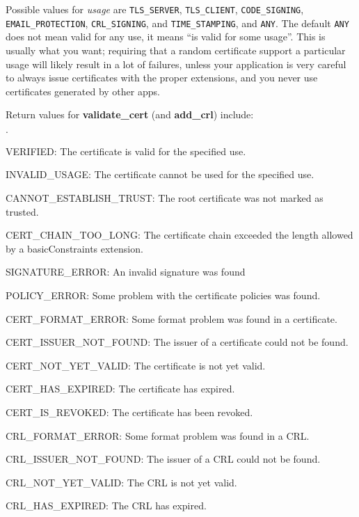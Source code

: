 \documentclass{article}
\newcommand{\function}[1]{\textbf{#1}}
\newcommand{\type}[1]{\texttt{#1}}
\renewcommand{\arg}[1]{\textsl{#1}}
\begin{document}
Possible values for \arg{usage} are \type{TLS\_SERVER},
\type{TLS\_CLIENT}, \type{CODE\_SIGNING}, \type{EMAIL\_PROTECTION},
\type{CRL\_SIGNING}, and \type{TIME\_STAMPING}, and \type{ANY}. The
default \type{ANY} does not mean valid for any use, it means ``is
valid for some usage''. This is usually what you want; requiring that
a random certificate support a particular usage will likely result in
a lot of failures, unless your application is very careful to always
issue certificates with the proper extensions, and you never use
certificates generated by other apps.

Return values for \function{validate\_cert} (and \function{add\_crl}) include:

\begin{list}{$\cdot$}
  \item VERIFIED: The certificate is valid for the specified use.
  \item
  \item INVALID\_USAGE: The certificate cannot be used for the specified use.

   \item CANNOT\_ESTABLISH\_TRUST: The root certificate was not marked as
         trusted.
   \item CERT\_CHAIN\_TOO\_LONG: The certificate chain exceeded the length
         allowed by a basicConstraints extension.
   \item SIGNATURE\_ERROR: An invalid signature was found
   \item POLICY\_ERROR: Some problem with the certificate policies was found.

   \item CERT\_FORMAT\_ERROR: Some format problem was found in a certificate.
   \item CERT\_ISSUER\_NOT\_FOUND: The issuer of a certificate could not be
         found.
   \item CERT\_NOT\_YET\_VALID: The certificate is not yet valid.
   \item CERT\_HAS\_EXPIRED: The certificate has expired.
   \item CERT\_IS\_REVOKED: The certificate has been revoked.

   \item CRL\_FORMAT\_ERROR: Some format problem was found in a CRL.
   \item CRL\_ISSUER\_NOT\_FOUND: The issuer of a CRL could not be found.
   \item CRL\_NOT\_YET\_VALID: The CRL is not yet valid.
   \item CRL\_HAS\_EXPIRED: The CRL has expired.


\end{list}
\end{document}

